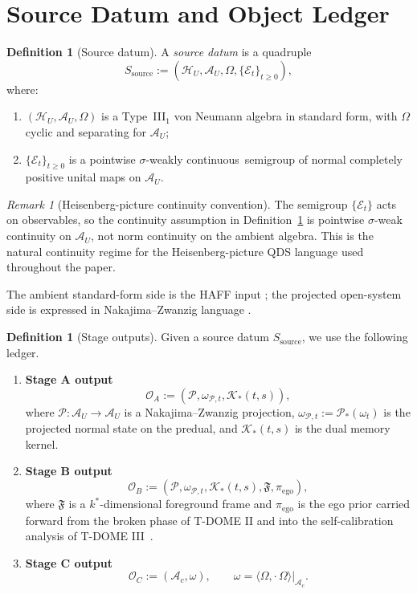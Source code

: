\documentclass[12pt]{article}
\theoremstyle{definition}
\newtheorem{definition}[theorem]{Definition}
\theoremstyle{remark}
\newtheorem{remark}[theorem]{Remark}
\newcommand{\FISourceContinuityPhrase}{pointwise \(\sigma\)-weakly continuous}
\newcommand{\FIHeisenbergContinuityRemark}{%
\begin{remark}[Heisenberg-picture continuity convention]
The semigroup \(\{\mathcal E_t\}\) acts on observables, so the
continuity assumption in Definition~\ref{sec:ledger} is pointwise
\(\sigma\)-weak continuity on \(\mathcal A_U\), not norm continuity on
the ambient algebra. This is the natural continuity regime for the
Heisenberg-picture QDS language used throughout the paper.
\end{remark}}
\begin{document}
\section{Source Datum and Object Ledger}\label{sec:ledger}

\begin{definition}[Source datum]
A \emph{source datum} is a quadruple
\[
S_{\mathrm{source}}
:=
(\mathcal H_U,\mathcal A_U,\Omega,\{\mathcal E_t\}_{t\ge 0}),
\]
where:
\begin{enumerate}
\item \((\mathcal H_U,\mathcal A_U,\Omega)\) is a Type~III\(_1\) von
  Neumann algebra in standard form, with \(\Omega\) cyclic and
  separating for \(\mathcal A_U\);
\item \(\{\mathcal E_t\}_{t\ge 0}\) is a \FISourceContinuityPhrase\
  semigroup of normal completely positive unital maps on
  \(\mathcal A_U\).
\end{enumerate}
\end{definition}

\FIHeisenbergContinuityRemark

The ambient standard-form side is the HAFF input
\cite{HAFFD}; the projected open-system side is expressed in
Nakajima--Zwanzig language \cite{Nakajima1958,Zwanzig1960,
BreuerPetruccione2002}.

\begin{definition}[Stage outputs]
Given a source datum \(S_{\mathrm{source}}\), we use the following
ledger.
\begin{enumerate}
\item \textbf{Stage A output}
  \[
  \mathcal O_A
  :=
  (\mathcal P,\omega_{\mathcal P,t},\mathcal K_*(t,s)),
  \]
  where \(\mathcal P:\mathcal A_U\to\mathcal A_U\) is a
  Nakajima--Zwanzig projection,
  \(\omega_{\mathcal P,t}:=\mathcal P_*(\omega_t)\) is the projected
  normal state on the predual, and \(\mathcal K_*(t,s)\) is the dual
  memory kernel.
\item \textbf{Stage B output}
  \[
  \mathcal O_B
  :=
  (\mathcal P,\omega_{\mathcal P,t},\mathcal K_*(t,s),\mathfrak F,\pi_{\mathrm{ego}}),
  \]
  where \(\mathfrak F\) is a \(k^*\)-dimensional foreground frame and
  \(\pi_{\mathrm{ego}}\) is the ego prior carried forward from the
  broken phase of T-DOME II and into the self-calibration analysis of
  T-DOME III~\cite{TDOMEII,TDOMEIII}.
\item \textbf{Stage C output}
  \[
  \mathcal O_C
  :=
  (\mathcal A_c,\omega),
  \qquad
  \omega=\langle\Omega,\cdot\,\Omega\rangle|_{\mathcal A_c}.
  \]
\end{enumerate}
\end{definition}
\end{document}
